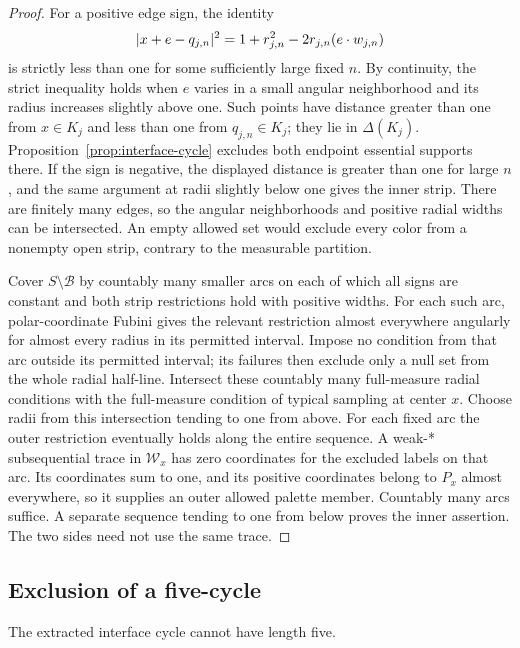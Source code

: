\begin{proof}
For a positive edge sign, the identity
\[
 \lvert x+e-q_{j,n}\rvert^2
 =1+r_{j,n}^2-2r_{j,n}(e\cdot w_{j,n})
\]
is strictly less than one for some sufficiently large fixed \(n\).
By continuity, the strict inequality holds when \(e\) varies in
a small angular neighborhood and its radius increases slightly
above one.  Such points have distance greater than one from
\(x\in K_j\) and less than one from \(q_{j,n}\in K_j\); they lie
in \(\Delta(K_j)\).  Proposition~\ref{prop:interface-cycle} excludes both
endpoint essential supports there.  If the sign is negative,
the displayed distance is greater than one for large \(n\), and
the same argument at radii slightly below one gives the inner
strip.  There are finitely many edges, so the angular neighborhoods
and positive radial widths can be intersected.  An empty allowed
set would exclude every color from a nonempty open strip, contrary
to the measurable partition.

Cover \(S\setminus\mathcal B\) by countably many smaller arcs
on each of which all signs are constant and both strip restrictions
hold with positive widths.  For each such arc, polar-coordinate
Fubini gives the relevant restriction almost everywhere angularly
for almost every radius in its permitted interval.  Impose no
condition from that arc outside its permitted interval; its failures
then exclude only a null set from the whole radial half-line.
Intersect these countably many full-measure radial conditions with the
full-measure condition of typical sampling at center \(x\).
Choose radii from this intersection tending to one from above.
For each fixed arc the outer restriction eventually holds along
the entire sequence.  A weak-* subsequential trace in
\(\mathcal W_x\) has zero coordinates for the excluded labels
on that arc.  Its coordinates sum to one, and its positive
coordinates belong to \(P_x\) almost everywhere, so it supplies
an outer allowed palette member.  Countably many arcs suffice.
A separate sequence tending to one from below proves the inner
assertion.  The two sides need not use the same trace.
\end{proof}

\subsection{Exclusion of a five-cycle}

\begin{proposition}\label{prop:angular-five}
The extracted interface cycle cannot have length five.
\end{proposition}

